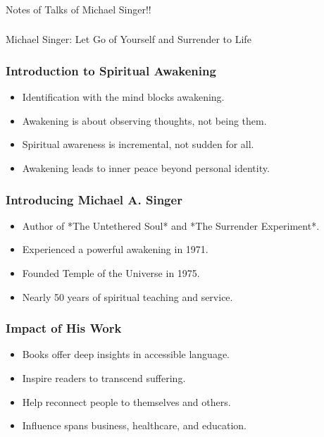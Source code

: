 \begin{frame}[fragile]\frametitle{}
\begin{center}
{\Large Notes of Talks of Michael Singer!!}

\end{center}
\end{frame}


\begin{frame}[fragile]\frametitle{}
\begin{center}
{\Large Michael Singer: Let Go of Yourself and Surrender to Life}

\end{center}
\end{frame}

\begin{frame}[fragile]\frametitle{Introduction to Spiritual Awakening}
    \begin{itemize}
        \item Identification with the mind blocks awakening.
        \item Awakening is about observing thoughts, not being them.
        \item Spiritual awareness is incremental, not sudden for all.
        \item Awakening leads to inner peace beyond personal identity.
    \end{itemize}
\end{frame}

\begin{frame}[fragile]\frametitle{Introducing Michael A. Singer}
    \begin{itemize}
        \item Author of *The Untethered Soul* and *The Surrender Experiment*.
        \item Experienced a powerful awakening in 1971.
        \item Founded Temple of the Universe in 1975.
        \item Nearly 50 years of spiritual teaching and service.
    \end{itemize}
\end{frame}

\begin{frame}[fragile]\frametitle{Impact of His Work}
    \begin{itemize}
        \item Books offer deep insights in accessible language.
        \item Inspire readers to transcend suffering.
        \item Help reconnect people to themselves and others.
        \item Influence spans business, healthcare, and education.
    \end{itemize}
\end{frame}

